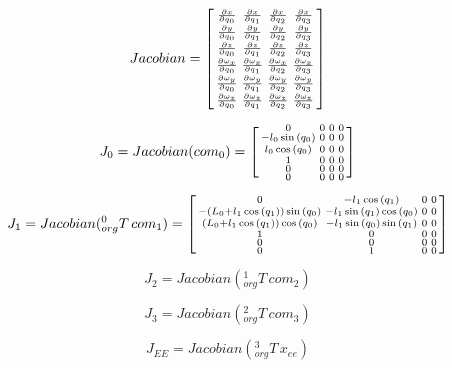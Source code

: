 \documentclass{article}
\begin{document}
\begin{equation}
	Jacobian = 
	\begin{bsmallmatrix}
	\frac{\partial x}{\partial q_0} & \frac{\partial x}{\partial q_1} & \frac{\partial x}{\partial q_2} & \frac{\partial x}{\partial q_3}\\
	\frac{\partial y}{\partial q_0} & \frac{\partial y}{\partial q_1} & \frac{\partial y}{\partial q_2} & \frac{\partial y}{\partial q_3}\\
	\frac{\partial z}{\partial q_0} & \frac{\partial z}{\partial q_1} & \frac{\partial z}{\partial q_2} & \frac{\partial z}{\partial q_3}\\
	\frac{\partial \omega_x}{\partial q_0} & \frac{\partial \omega_x}{\partial q_1} & \frac{\partial \omega_x}{\partial q_2} & \frac{\partial \omega_x}{\partial q_3}\\
	\frac{\partial \omega_y}{\partial q_0} & \frac{\partial \omega_y}{\partial q_1} & \frac{\partial \omega_y}{\partial q_2} & \frac{\partial \omega_y}{\partial q_3}\\
	\frac{\partial \omega_z}{\partial q_0} & \frac{\partial \omega_z}{\partial q_1} & \frac{\partial \omega_z}{\partial q_2} & \frac{\partial \omega_z}{\partial q_3}\\
	\end{bsmallmatrix}
\end{equation}

\begin{equation}
	J_0 =  Jacobian(com_0) =
	\begin{bsmallmatrix}
	0 & 0 & 0 & 0\\
	- l_{0} \sin{(q_{0} )} & 0 & 0 & 0\\
	l_{0} \cos{(q_{0} )} & 0 & 0 & 0\\
	1 & 0 & 0 & 0\\
	0 & 0 & 0 & 0\\
	0 & 0 & 0 & 0
	\end{bsmallmatrix}
\end{equation}

\begin{equation}
	J_1 = Jacobian({}_{org}^0 T \, com_1) =
	\begin{bsmallmatrix}
	0 & - l_{1} \cos{(q_{1} )} & 0 & 0\\- (L_{0} + l_{1} \cos{(q_{1} )}) \sin{(q_{0} )} & - l_{1} \sin{(q_{1} )} \cos{(q_{0} )} & 0 & 0\\
	(L_{0} + l_{1} \cos{(q_{1} )}) \cos{(q_{0} )} & - l_{1} \sin{(q_{0} )} \sin{(q_{1} )} & 0 & 0\\
	1 & 0 & 0 & 0\\
	0 & 0 & 0 & 0\\
	0 & 1 & 0 & 0
\end{bsmallmatrix}
\end{equation}

\begin{equation}
	J_2 = Jacobian({}_{org}^1 T \, com_2)
\end{equation}

\begin{equation}
	J_3 = Jacobian({}_{org}^2 T \, com_3)
\end{equation}

\begin{equation}
	J_{EE} = Jacobian({}_{org}^3 T \, x_{ee})
\end{equation}
\end{document}
